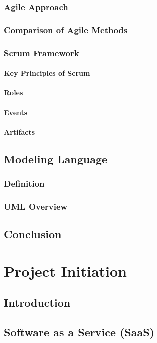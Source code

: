 \documentclass[a4paper,12pt]{report}
\begin{document}
\subsection{Agile Approach}
\subsection{Comparison of Agile Methods}
\subsection{Scrum Framework}
\subsubsection{Key Principles of Scrum}
\subsubsection{Roles}
\subsubsection{Events}
\subsubsection{Artifacts}
\section{Modeling Language}
\subsection{Definition}
\subsection{UML Overview}
\section{Conclusion}

\chapter{Project Initiation}

\minitoc
\section{Introduction}
\section{Software as a Service (SaaS)}
\end{document}
